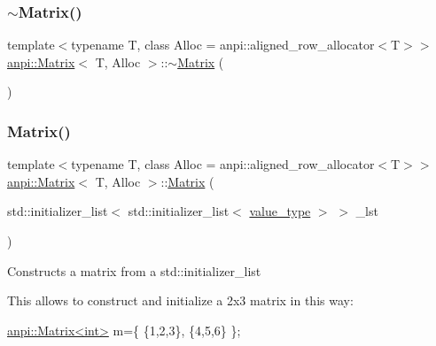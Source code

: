 \mbox{\label{classanpi_1_1Matrix_ab27bf73e875186026c86483660292762}} 
\subsubsection{\texorpdfstring{$\sim$\+Matrix()}{~Matrix()}}
{\footnotesize\ttfamily template$<$typename T, class Alloc = anpi\+::aligned\+\_\+row\+\_\+allocator$<$\+T$>$$>$ \\
\hyperlink{classanpi_1_1Matrix}{anpi\+::\+Matrix}$<$ T, Alloc $>$\+::$\sim$\hyperlink{classanpi_1_1Matrix}{Matrix} (\begin{DoxyParamCaption}{ }\end{DoxyParamCaption})\hspace{0.3cm}{\ttfamily [noexcept]}}

\mbox{\label{classanpi_1_1Matrix_ac48c502a4abd6530350ed6d76aea9e31}} 
\subsubsection{\texorpdfstring{Matrix()}{Matrix()}\hspace{0.1cm}{\footnotesize\ttfamily [16/17]}}
{\footnotesize\ttfamily template$<$typename T, class Alloc = anpi\+::aligned\+\_\+row\+\_\+allocator$<$\+T$>$$>$ \\
\hyperlink{classanpi_1_1Matrix}{anpi\+::\+Matrix}$<$ T, Alloc $>$\+::\hyperlink{classanpi_1_1Matrix}{Matrix} (\begin{DoxyParamCaption}\item[{std\+::initializer\+\_\+list$<$ std\+::initializer\+\_\+list$<$ \hyperlink{classanpi_1_1Matrix_ad755076524c16fc494a392b0a66065cb}{value\+\_\+type} $>$ $>$}]{\+\_\+lst }\end{DoxyParamCaption})}

Constructs a matrix from a std\+::initializer\+\_\+list

This allows to construct and initialize a 2x3 matrix in this way\+:


\begin{DoxyCode}
\hyperlink{classanpi_1_1Matrix}{anpi::Matrix<int>} m=\{ \{1,2,3\}, \{4,5,6\} \};
\end{DoxyCode}
 \mbox{\label{classanpi_1_1Matrix_ab79b0f2cfe8a42aad18f448b7796e129}} 
